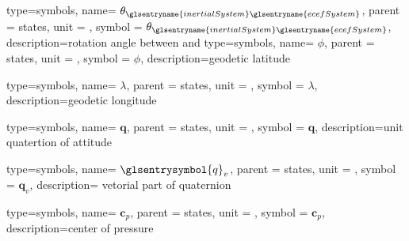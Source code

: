 {type=symbols,
	name= \ensuremath{\theta_{\glsentryname{inertialSystem}\glsentryname{ecefSystem}}},
	parent = {states},
	unit = \unexpanded{\si{\radian\per\second}},
	symbol = \ensuremath{\theta_{\glsentryname{inertialSystem}\glsentryname{ecefSystem}}},
	description={rotation angle between  and }
}
{type=symbols,
	name= \ensuremath{\phi},
	parent = {states},
	unit = \unexpanded{\si{\radian}},
	symbol = \ensuremath{\phi},
	description={geodetic latitude}
}

{type=symbols,
	name= \ensuremath{\lambda},
	parent = {states},
	unit = \unexpanded{\si{\radian}},
	symbol = \ensuremath{\lambda},
	description={geodetic longitude}
}


{type=symbols,
	name= \ensuremath{\mathbf{q}},
	parent = {states},
	unit = \unexpanded{},
	symbol = \ensuremath{\mathbf{q}},
	description={unit quatertion of attitude}
}

{type=symbols,
	name= \ensuremath{\glsentrysymbol{q}_v},
	parent = {states},
	unit = {},
	symbol = \ensuremath{\mathbf{q}_v},
	description={ vetorial part of quaternion }
}

{type=symbols,
	name= \ensuremath{\mathbf{c}_p},
	parent = {states},
	unit = \unexpanded{\si{\meter}},
	symbol = \ensuremath{\mathbf{c}_p},
	description={center of pressure}
}

